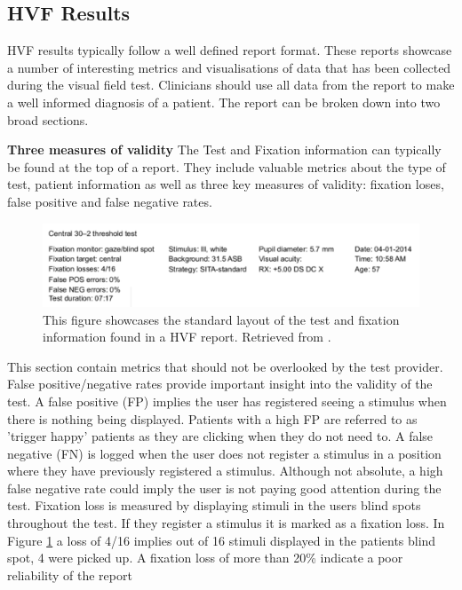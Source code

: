 \documentclass{l4proj}
\begin{document}
\subsection{HVF Results} \label{Background-HVF-Results}

HVF results typically follow a well defined report format. These reports showcase a number of interesting metrics and visualisations of data that has been collected during the visual field test. Clinicians should use all data from the report to make a well informed diagnosis of a patient. The report can be broken down into two broad sections.

\textbf{Three measures of validity} \label{validty-metrics} \newline
The Test and Fixation information can typically be found at the top of a report. They include valuable metrics about the type of test, patient information as well as three key measures of validity: fixation loses, false positive and false negative rates.
\begin{figure}[htbp]
    \centering
    \includegraphics[width=1\linewidth]{images/Sample_Report_Metrics.png}    

    \caption{This figure showcases the standard layout of the test and fixation information found in a HVF report. Retrieved from \citet{HerroLam2015}.
    }

    \label{fig:example_metrics} 
\end{figure}

This section contain metrics that should not be overlooked by the test provider. False positive/negative rates provide important insight into the validity of the test. A false positive (FP) implies the user has registered seeing a stimulus when there is nothing being displayed. Patients with a high FP are referred to as 'trigger happy' patients as they are clicking when they do not need to. A false negative (FN) is logged when the user does not register a stimulus in a position where they have previously registered a stimulus. Although not absolute, a high false negative rate could imply the user is not paying good attention during the test. Fixation loss is measured by displaying stimuli in the users blind spots throughout the test. If they register a stimulus it is marked as a fixation loss. In Figure \ref{fig:example_metrics} a loss of 4/16 implies out of 16 stimuli displayed in the patients blind spot, 4 were picked up. A fixation loss of more than 20\% indicate a poor reliability of the report \citep{RuiaTripathy2021HVF}
\end{document}
